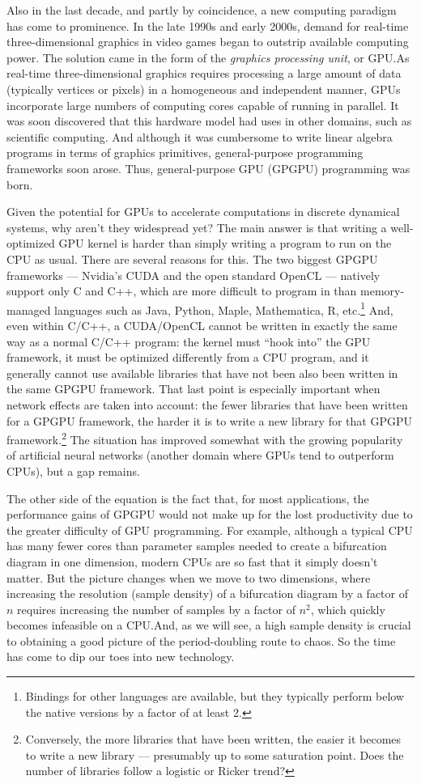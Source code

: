 \documentclass{article}
\theoremstyle{plain}
\theoremstyle{definition}
\begin{document}
Also in the last decade, and partly by coincidence, a new computing paradigm has come to prominence. In the late 1990s and early 2000s, demand for real-time three-dimensional graphics in video games began to outstrip available computing power. The solution came in the form of the \emph{graphics processing unit}, or GPU.\@ As real-time three-dimensional graphics requires processing a large amount of data (typically vertices or pixels) in a homogeneous and independent manner, GPUs incorporate large numbers of computing cores capable of running in parallel. It was soon discovered that this hardware model had uses in other domains, such as scientific computing. And although it was cumbersome to write linear algebra programs in terms of graphics primitives, general-purpose programming frameworks soon arose. Thus, general-purpose GPU (GPGPU) programming was born.

Given the potential for GPUs to accelerate computations in discrete dynamical systems, why aren't they widespread yet? The main answer is that writing a well-optimized GPU kernel is harder than simply writing a program to run on the CPU as usual. There are several reasons for this. The two biggest GPGPU frameworks --- Nvidia's CUDA and the open standard OpenCL --- natively support only C and C++, which are more difficult to program in than memory-managed languages such as Java, Python, Maple, Mathematica, R, etc.\footnote{Bindings for other languages are available, but they typically perform below the native versions by a factor of at least 2.} And, even within C/C++, a CUDA/OpenCL cannot be written in exactly the same way as a normal C/C++ program: the kernel must ``hook into'' the GPU framework, it must be optimized differently from a CPU program, and it generally cannot use available libraries that have not been also been written in the same GPGPU framework. That last point is especially important when network effects are taken into account: the fewer libraries that have been written for a GPGPU framework, the harder it is to write a new library for that GPGPU framework.\footnote{Conversely, the more libraries that have been written, the easier it becomes to write a new library --- presumably up to some saturation point. Does the number of libraries follow a logistic or Ricker trend?} The situation has improved somewhat with the growing popularity of artificial neural networks (another domain where GPUs tend to outperform CPUs), but a gap remains.

The other side of the equation is the fact that, for most applications, the performance gains of GPGPU would not make up for the lost productivity due to the greater difficulty of GPU programming. For example, although a typical CPU has many fewer cores than parameter samples needed to create a bifurcation diagram in one dimension, modern CPUs are so fast that it simply doesn't matter. But the picture changes when we move to two dimensions, where increasing the resolution (sample density) of a bifurcation diagram by a factor of \(n\) requires increasing the number of samples by a factor of \(n^2\), which quickly becomes infeasible on a CPU.\@ And, as we will see, a high sample density is crucial to obtaining a good picture of the period-doubling route to chaos. So the time has come to dip our toes into new technology.
\end{document}
